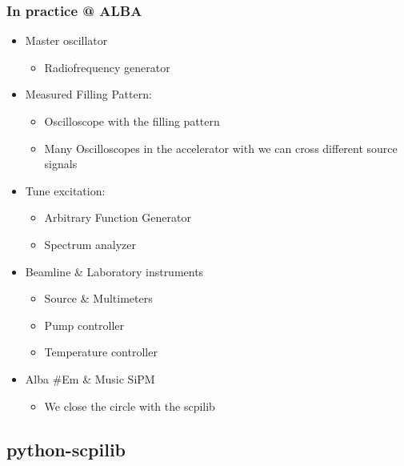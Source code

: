 \documentclass{beamer}
\begin{document}
\begin{frame}
  \frametitle{In practice @ ALBA}
  \begin{itemize}
    \item<2-> Master oscillator
    \begin{itemize}
      \item Radiofrequency generator
    \end{itemize}
    \item<3-> Measured Filling Pattern: 
    \begin{itemize}
      \item Oscilloscope with the filling pattern
      \item Many Oscilloscopes in the accelerator with we can cross different source signals
    \end{itemize}
    \item<4-> Tune excitation:
    \begin{itemize}
      \item Arbitrary Function Generator
      \item Spectrum analyzer
    \end{itemize}
    \item<5-> Beamline \& Laboratory instruments
    \begin{itemize}
      \item Source \& Multimeters
      \item Pump controller 
      \item Temperature controller 
    \end{itemize}
    \item<6-> Alba \#Em \& Music SiPM
    \begin{itemize}
      \item We close the circle with the scpilib
    \end{itemize}
  \end{itemize}
\end{frame}


\subsection{python-scpilib}
\end{document}
